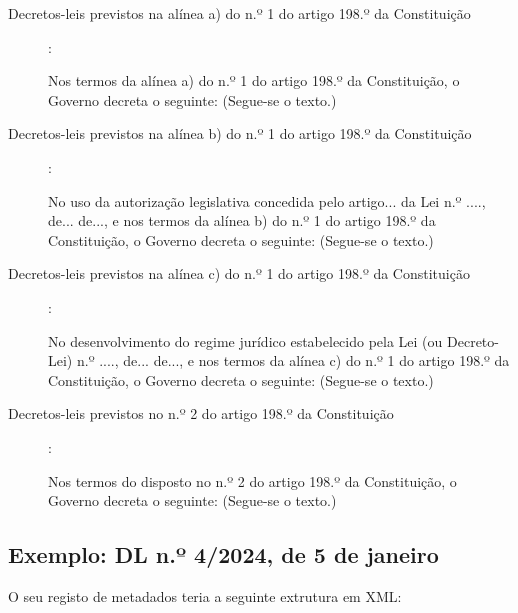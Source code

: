 \begin{description}
    \item[Decretos-leis previstos na alínea a) do n.º 1 do artigo 198.º da Constituição]: 
    
    \begin{quoting}
        Nos termos da alínea a) do n.º 1 do artigo 198.º da Constituição, o Governo decreta o seguinte:
        (Segue-se o texto.)
    \end{quoting}

    \item[Decretos-leis previstos na alínea b) do n.º 1 do artigo 198.º da Constituição]: 
    
    \begin{quoting}
        No uso da autorização legislativa concedida pelo artigo... da Lei n.º ...., de... 
        de..., e nos termos da alínea b) do n.º 1 do artigo 198.º da Constituição, 
        o Governo decreta o seguinte:
        (Segue-se o texto.)
    \end{quoting}

    \item[Decretos-leis previstos na alínea c) do n.º 1 do artigo 198.º da Constituição]: 
    
    \begin{quoting}
        No desenvolvimento do regime jurídico estabelecido pela Lei (ou Decreto-Lei) n.º ...., 
        de... de..., e nos termos da alínea c) do n.º 1 do artigo 198.º da Constituição, 
        o Governo decreta o seguinte:
        (Segue-se o texto.)
    \end{quoting}

    \item[Decretos-leis previstos no n.º 2 do artigo 198.º da Constituição]: 
    
    \begin{quoting}
        Nos termos do disposto no n.º 2 do artigo 198.º da Constituição, o Governo decreta o seguinte:
        (Segue-se o texto.)
    \end{quoting}

\end{description}

\subsection{Exemplo: DL n.º 4/2024, de 5 de janeiro} 
    
O seu registo de metadados teria a seguinte extrutura em XML:
    

